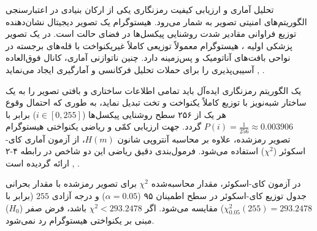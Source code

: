 

تحلیل آماری و ارزیابی کیفیت رمزنگاری یکی از ارکان بنیادی در اعتبارسنجی الگوریتم‌های امنیتی تصویر به شمار می‌رود. هیستوگرام یک تصویر دیجیتال نشان‌دهنده توزیع فراوانی مقادیر شدت روشنایی پیکسل‌ها در فضای حالت است. در یک تصویر پزشکی اولیه ، هیستوگرام معمولاً توزیعی کاملاً غیریکنواخت با قله‌های برجسته در نواحی بافت‌های آناتومیک و پس‌زمینه دارد. چنین ناتوازنی آماری، کانال فوق‌العاده آسیبی‌پذیری را برای حملات تحلیل فرکانسی و آمارگیری ایجاد می‌نماید , .\par



یک الگوریتم رمزنگاری ایده‌آل باید تمامی اطلاعات ساختاری و بافتی تصویر را به یک ساختار شبه‌نویز با توزیع کاملاً یکنواخت و تخت  تبدیل نماید، به طوری که احتمال وقوع هر یک از ۲۵۶ سطح روشنایی پیکسل‌ها ($i \in [0,\allowbreak{} 255]$) برابر با $P(i) = \frac{1}{256} \approx 0.003906$ گردد. جهت ارزیابی کمّی و ریاضی یکنواختی هیستوگرام تصویر رمزشده، علاوه بر محاسبه آنتروپی شانون $H(m)$، از آزمون آماری کای{-}اسکوئر ($\chi^2$) استفاده می‌شود. فرمول‌بندی دقیق ریاضی این دو شاخص در رابطه ۴{-}۲ ارائه گردیده است , .\par






در آزمون کای{-}اسکوئر، مقدار محاسبه‌شده $\chi^2$ برای تصویر رمزشده با مقدار بحرانی جدول توزیع کای{-}اسکوئر در سطح اطمینان ۹۵ ($\alpha = 0.05$) و درجه آزادی $255$ (برابر با $\chi^2_{0.05}(255) = 293.2478$) مقایسه می‌شود. اگر $\chi^2 < 293.2478$ باشد، فرض صفر ($H_0$) مبنی بر یکنواختی هیستوگرام رد نمی‌شود.\par

